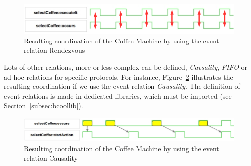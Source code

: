\begin{figure}[h]
	\center
	\includegraphics[width=.6\textwidth]{bcool/figs/runningrdv}
	\caption{Resulting coordination of the Coffee Machine by using the event relation Rendezvous}
	\label{fig:runningrdv}
\end{figure}
	

Lots of other relations, more or less complex can be defined, \eg \emph{Causality}, \emph{FIFO} or ad-hoc relations for specific protocols. For instance, Figure~\ref{fig:runningrunningcausality} illustrates the resulting coordination if we use the event relation \emph{Causality}. The definition of event relations is made in dedicated libraries, which must be imported (see Section~\ref{subsec:bcoollib}).

\begin{figure}[h]
	\center
	\includegraphics[width=.65\textwidth]{bcool/figs/runningcausality}
	\caption{Resulting coordination of the Coffee Machine by using the event relation Causality}
	\label{fig:runningrunningcausality}
\end{figure}